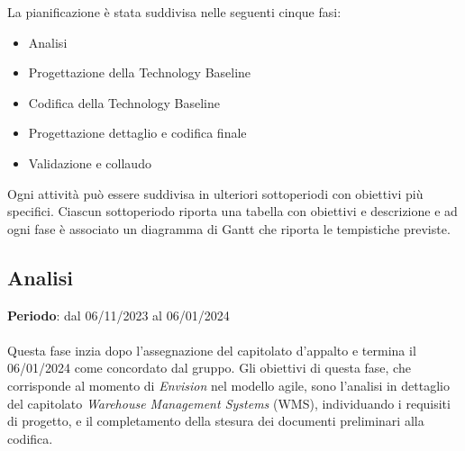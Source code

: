 La pianificazione è stata suddivisa nelle seguenti cinque fasi:

\begin{itemize}
    \item Analisi
    \item Progettazione della Technology Baseline
    \item Codifica della Technology Baseline
    \item Progettazione dettaglio e codifica finale
    \item Validazione e collaudo
\end{itemize}

Ogni attività può essere suddivisa in ulteriori sottoperiodi con obiettivi più specifici. Ciascun sottoperiodo riporta una tabella con obiettivi e descrizione e ad ogni fase è associato un diagramma di Gantt che riporta le tempistiche previste.

\subsection{Analisi}\label{sec:pianificazione:analisi}

\textbf{Periodo}: dal 06/11/2023 al 06/01/2024\\\\
Questa fase inzia dopo l'assegnazione del capitolato d'appalto e termina il 06/01/2024 come concordato dal gruppo. Gli obiettivi di questa fase, che corrisponde al momento di \textit{Envision} nel modello agile, sono l'analisi in dettaglio del capitolato \textit{Warehouse Management Systems} (WMS), individuando i requisiti di progetto, e il completamento della stesura dei documenti preliminari alla codifica.

